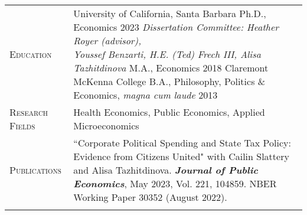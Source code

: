 \documentclass[11pt]{article}
\newcommand{\xspace}{19pt}
\begin{document}
\begin{tabularx}{\textwidth}{@{}Y Z@{}}
	\textsc{Education} &
	University of California, Santa Barbara
	\vspace{3pt} \newline
	\hspace*{20pt} Ph.D., Economics \hfill 2023%
	\vspace{3pt} \newline
	\hspace*{20pt} \textit{Dissertation Committee: Heather Royer (advisor), \newline \hspace*{20pt} Youssef Benzarti, H.E. (Ted) Frech III, Alisa Tazhitdinova} 
	\vspace{3pt} \newline
	\hspace*{20pt} M.A., Economics \hfill 2018%
	\vspace{10pt} \newline
	Claremont McKenna College
	\vspace{3pt} \newline
	\hspace*{20pt} B.A., Philosophy, Politics \& Economics, \textit{magna cum laude} \hfill 2013%
    \\  \addlinespace[\xspace] 

	\textsc{Research Fields} & 
	Health Economics, Public Economics, Applied Microeconomics
	\\ \addlinespace[\xspace] 

	\textsc{Publications} & 
	``Corporate Political Spending and State Tax Policy: Evidence from Citizens United" \newline with Cailin Slattery and Alisa Tazhitdinova. \textbf{\textit{Journal of Public Economics}}, \newline May 2023, Vol. 221, 104859. NBER Working Paper 30352 (August 2022).
	\\ \addlinespace[\xspace] 
	

\end{tabularx}
\end{document}
